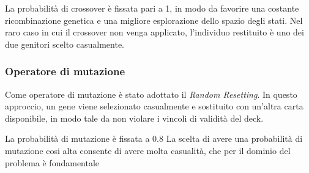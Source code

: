 \documentclass{article}
\begin{document}
La probabilità di crossover è fissata pari a 1, in modo da favorire una costante ricombinazione genetica e una migliore esplorazione dello spazio degli stati. 
Nel raro caso in cui il crossover non venga applicato, l’individuo restituito è uno dei due genitori scelto casualmente.

\subsubsection{Operatore di mutazione}

Come operatore di mutazione è stato adottato il \textit{Random Resetting}. 
In questo approccio, un gene viene selezionato casualmente e sostituito con un’altra carta disponibile, in modo tale da non violare i vincoli di validità del deck.

La probabilità di mutazione è fissata a 0.8
La scelta di avere una probabilità di mutazione cosi alta consente di avere molta casualità, che per il dominio del problema è fondamentale 
\end{document}
